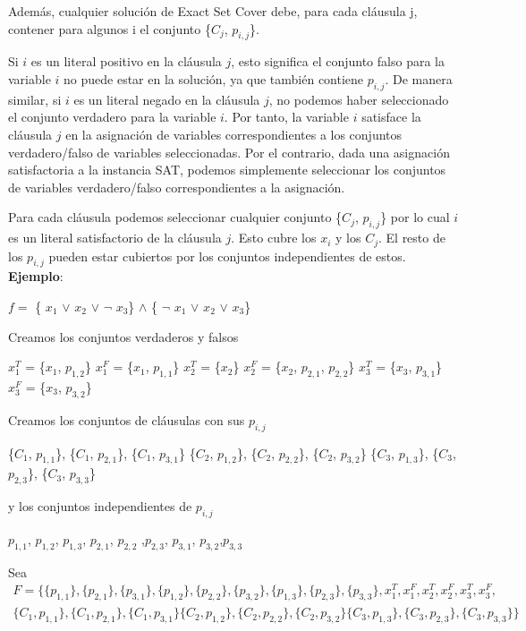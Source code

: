 \documentclass{article}
\begin{document}
Además, cualquier solución de Exact Set Cover debe, para cada cláusula j, contener para algunos i el conjunto \{$C_j$, $p_{i,j}$\}.

Si \(i\) es un literal positivo en la cláusula \(j\), esto significa el conjunto falso para la variable \(i\) no puede estar en la solución, ya que también contiene $p_{i,j}$. De manera similar, si \(i\) es un literal negado en la cláusula \(j\), no podemos haber seleccionado el conjunto verdadero para la variable \(i\). Por tanto, la variable \(i\) satisface la cláusula \(j\) en la asignación de variables correspondientes a los conjuntos verdadero/falso de variables seleccionadas.
Por el contrario, dada una asignación satisfactoria a la instancia SAT, podemos simplemente seleccionar los conjuntos de variables verdadero/falso correspondientes a la asignación.

Para cada cláusula podemos seleccionar cualquier conjunto \{$C_j$, $p_{i,j}$\} por lo cual \(i\) es un literal satisfactorio de la cláusula \(j\). Esto cubre los $x_i$ y los $C_j$. El resto de los $p_{i,j}$ pueden estar cubiertos por los conjuntos independientes de estos.\\

\textbf{Ejemplo}:

$f = $   \{ $x_{1}$ $\vee$ $x_{2}$ $\vee$ $\neg$ $x_{3}$\} $\wedge$ \{ $\neg$ $x_{1}$ $\vee$ $x_{2}$ $\vee$ $x_{3}$\}

Creamos los conjuntos verdaderos y falsos

$x_{1}^{T}$ = \{$x_1$, $p_{1,2}$\}
$x_{1}^{F}$ = \{$x_1$, $p_{1,1}$\}
$x_{2}^{T}$ = \{$x_2$\}
$x_{2}^{F}$ = \{$x_2$, $p_{2,1}$, $p_{2,2}$\}
$x_{3}^{T}$ = \{$x_3$, $p_{3,1}$\}
$x_{3}^{F}$ = \{$x_3$, $p_{3,2}$\}

Creamos los conjuntos de cláusulas con sus $p_{i,j}$

\{$C_1$, $p_{1,1}$\}, \{$C_1$, $p_{2,1}$\}, \{$C_1$, $p_{3,1}$\}
\{$C_2$, $p_{1,2}$\}, \{$C_2$, $p_{2,2}$\}, \{$C_2$, $p_{3,2}$\}
\{$C_3$, $p_{1,3}$\}, \{$C_3$, $p_{2,3}$\}, \{$C_3$, $p_{3,3}$\}

y los conjuntos independientes de $p_{i,j}$

$p_{1,1}$, $p_{1,2}$, $p_{1,3}$, $p_{2,1}$, $p_{2,2}$ ,$p_{2,3}$, $p_{3,1}$, $p_{3,2}$,$p_{3,3}$

Sea
\begin{multline}
    F = \{ \{p_{1,1}\}, \{p_{2,1}\},\{p_{3,1}\},\{p_{1,2}\},\{p_{2,2}\},
    \{p_{3,2}\},\{p_{1,3}\}, \{p_{2,3}\},\{p_{3,3}\}, x_{1}^{T},
    x_{1}^{F}, x_{2}^{T}, x_{2}^{F}, x_{3}^{T}, x_{3}^{F},\\
    \{C_1, p_{1,1}\}, \{C_1, p_{2,1}\}, \{C_1, p_{3,1}\}
    \{C_2, p_{1,2}\}, \{C_2, p_{2,2}\}, \{C_2, p_{3,2}\} \{C_3, p_{1,3}\},
    \{C_3, p_{2,3}\}, \{C_3, p_{3,3}\}\}\
\end{multline}
\end{document}
